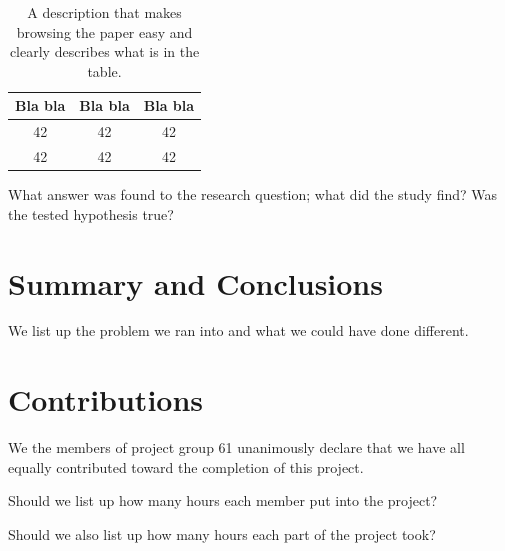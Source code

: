 \documentclass[a4paper,12pt]{article}
\begin{document}
\begin{table}
\begin{center}
\begin{tabular}{|c|c|c|}
\hline
Bla bla & Bla bla & Bla bla \\ \hline
42 & 42 & 42 \\ \hline
42 & 42 & 42 \\ \hline
\end{tabular}
\caption{A description that makes browsing the paper easy and clearly
describes what is in the table.}
\label{tab:results}
\end{center}
\end{table}

What answer was found to the research question; what did the study find? Was the tested hypothesis true?

\section{Summary and Conclusions}
\label{sec:summary}



We list up the problem we ran into and what we could have done different.




\section{Contributions}
\label{sec:contributions}
We the members of project group 61 unanimously declare that
we have all equally contributed toward the completion of this
project.

Should we list up how many hours each member put into the project?

Should we also list up how many hours each part of the project took?



\clearpage


\end{document}
